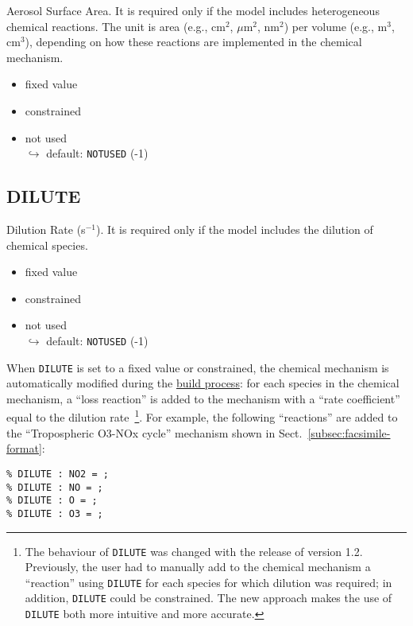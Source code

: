 Aerosol Surface Area. It is required only if the model includes
heterogeneous chemical reactions. The unit is area (e.g., cm$^2$,
$\mu$m$^2$, nm$^2$) per volume (e.g., m$^3$, cm$^3$), depending on how
these reactions are implemented in the chemical mechanism.

\begin{itemize}
\item fixed value
\item constrained
\item not used\\$\hookrightarrow$ default: \texttt{NOTUSED} (-1)
\end{itemize}

\subsection{DILUTE} \label{subsec:dilute}

Dilution Rate (s$^{-1}$). It is required only if the model includes
the dilution of chemical species.

\begin{itemize}
\item fixed value
\item constrained
\item not used\\$\hookrightarrow$ default: \texttt{NOTUSED} (-1)
\end{itemize}

When \texttt{DILUTE} is set to a fixed value or constrained, the
chemical mechanism is automatically modified during the
\hyperref[subsec:build-process]{build process}: for each species in
the chemical mechanism, a ``loss reaction'' is added to the mechanism
with a ``rate coefficient'' equal to the dilution rate~\footnote{The
  behaviour of \texttt{DILUTE} was changed with the release of version
  1.2. Previously, the user had to manually add to the chemical
  mechanism a ``reaction'' using \texttt{DILUTE} for each species for
  which dilution was required; in addition, \texttt{DILUTE} could be
  constrained. The new approach makes the use of \texttt{DILUTE} both
  more intuitive and more accurate.}. For example, the following
``reactions'' are added to the ``Tropospheric O3-NOx cycle'' mechanism
shown in Sect.~\ref{subsec:facsimile-format}:

\begin{verbatim}
% DILUTE : NO2 = ;
% DILUTE : NO = ;
% DILUTE : O = ;
% DILUTE : O3 = ;
\end{verbatim}

